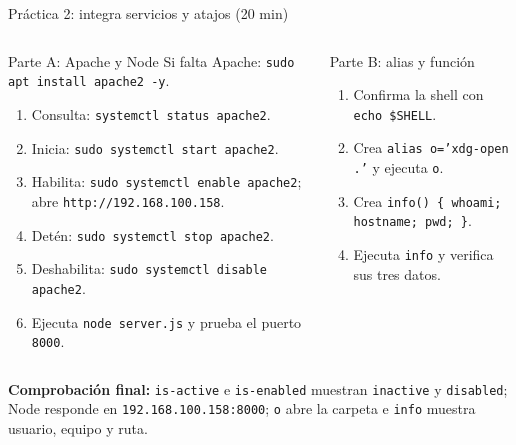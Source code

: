 \documentclass[aspectratio=169,10pt,c]{beamer}
\begin{document}
\begin{frame}[t]{Práctica 2: integra servicios y atajos \textnormal{\small(20 min)}}
\begin{columns}[T,onlytextwidth]
\begin{exampleblock}{Parte A: Apache y Node}
\scriptsize Si falta Apache: \texttt{sudo apt install apache2 -y}.\par\smallskip
\begin{enumerate}\setlength\itemsep{2pt}\small
  \item Consulta: \texttt{systemctl status apache2}.
  \item Inicia: \texttt{sudo systemctl start apache2}.
  \item Habilita: \texttt{sudo systemctl enable apache2}; abre \texttt{http://192.168.100.158}.
  \item Detén: \texttt{sudo systemctl stop apache2}.
  \item Deshabilita: \texttt{sudo systemctl disable apache2}.
  \item Ejecuta \texttt{node server.js} y prueba el puerto \texttt{8000}.
\end{enumerate}
\end{exampleblock}
\begin{exampleblock}{Parte B: alias y función}
\begin{enumerate}\setlength\itemsep{2pt}\small
  \item Confirma la shell con \texttt{echo \$SHELL}.
  \item Crea \texttt{alias o='xdg-open .'} y ejecuta \texttt{o}.
  \item Crea \texttt{info() \{ whoami; hostname; pwd; \}}.
  \item Ejecuta \texttt{info} y verifica sus tres datos.
\end{enumerate}
\end{exampleblock}
\end{columns}
\smallskip
\scriptsize\textbf{\color{utpRojo}Comprobación final:} \texttt{is-active} e \texttt{is-enabled} muestran \texttt{inactive} y \texttt{disabled}; Node responde en \texttt{192.168.100.158:8000}; \texttt{o} abre la carpeta e \texttt{info} muestra usuario, equipo y ruta.
\end{frame}
\end{document}
